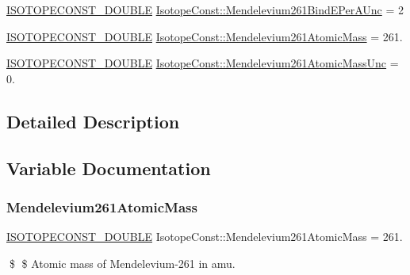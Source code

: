\begin{DoxyCompactItemize}
\item 
\mbox{\hyperlink{group___isotope_const-_macros_ga8f45a7272ce02c0b4c65c44636ed719a}{I\+S\+O\+T\+O\+P\+E\+C\+O\+N\+S\+T\+\_\+\+D\+O\+U\+B\+LE}} \mbox{\hyperlink{group___isotope_const-_mendelevium-_md261_ga8925252469d750f1442107c10f1cb6b6}{Isotope\+Const\+::\+Mendelevium261\+Bind\+E\+Per\+A\+Unc}} = 2
\item 
\mbox{\hyperlink{group___isotope_const-_macros_ga8f45a7272ce02c0b4c65c44636ed719a}{I\+S\+O\+T\+O\+P\+E\+C\+O\+N\+S\+T\+\_\+\+D\+O\+U\+B\+LE}} \mbox{\hyperlink{group___isotope_const-_mendelevium-_md261_ga11cd17673e9103eb2318e8da1a533756}{Isotope\+Const\+::\+Mendelevium261\+Atomic\+Mass}} = 261.
\item 
\mbox{\hyperlink{group___isotope_const-_macros_ga8f45a7272ce02c0b4c65c44636ed719a}{I\+S\+O\+T\+O\+P\+E\+C\+O\+N\+S\+T\+\_\+\+D\+O\+U\+B\+LE}} \mbox{\hyperlink{group___isotope_const-_mendelevium-_md261_ga672a4f7490d97a06f9934b0c402288d8}{Isotope\+Const\+::\+Mendelevium261\+Atomic\+Mass\+Unc}} = 0.
\end{DoxyCompactItemize}


\subsection{Detailed Description}


\subsection{Variable Documentation}
\mbox{\label{group___isotope_const-_mendelevium-_md261_ga11cd17673e9103eb2318e8da1a533756}} 
\subsubsection{\texorpdfstring{Mendelevium261\+Atomic\+Mass}{Mendelevium261AtomicMass}}
{\footnotesize\ttfamily \mbox{\hyperlink{group___isotope_const-_macros_ga8f45a7272ce02c0b4c65c44636ed719a}{I\+S\+O\+T\+O\+P\+E\+C\+O\+N\+S\+T\+\_\+\+D\+O\+U\+B\+LE}} Isotope\+Const\+::\+Mendelevium261\+Atomic\+Mass = 261.}

\$ \$ Atomic mass of Mendelevium-\/261 in amu. \mbox{\label{group___isotope_const-_mendelevium-_md261_ga672a4f7490d97a06f9934b0c402288d8}} 

